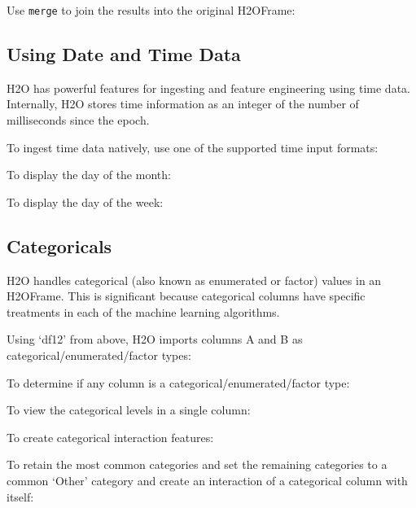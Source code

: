 {Use {\texttt{merge}} to join the results into the original H2OFrame:


\subsection{Using Date and Time Data} 
H2O has powerful features for ingesting and feature engineering using time data.  Internally, H2O
stores time information as an integer of the number of milliseconds since the epoch.

To ingest time data natively, use one of the supported time input formats:


To display the day of the month:


To display the day of the week:


\subsection{Categoricals}
H2O handles categorical (also known as enumerated or factor) values in an H2OFrame.  This is significant because categorical
columns have specific treatments in each of the machine learning algorithms.

Using `df12' from above, H2O imports columns A and B as categorical/enumerated/factor types:


To determine if any column is a categorical/enumerated/factor type:


To view the categorical levels in a single column:


To create categorical interaction features:


To retain the most common categories and set the remaining categories to a common `Other' category
 and create an interaction of a categorical column with itself:

}
